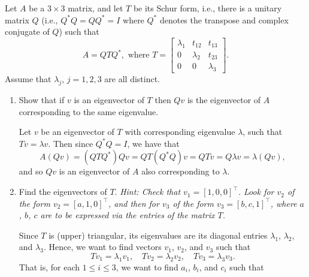 \documentclass{../../../kin_math}
\begin{document}
\begin{questions}
  \question Let $A$ be a $3 \times 3$ matrix, and let $T$ be its Schur form, i.e., there is a unitary matrix $Q$ (i.e., $Q^*Q = QQ^* = I$ where $Q^*$ denotes the transpose and complex conjugate of $Q$) such that
  \begin{equation*}
    A = QTQ^*, \text{ where } T = \begin{bmatrix} \lambda_1 & t_{12} & t_{13} \\ 0 & \lambda_2 & t_{23} \\ 0 & 0 & \lambda_3 \end{bmatrix}.
  \end{equation*}
  Assume that $\lambda_j$, $j = 1, 2, 3$ are all distinct.
  \begin{enumerate}
    \item Show that if $v$ is an eigenvector of $T$ then $Qv$ is the eigenvector of $A$ corresponding to the same eigenvalue.
    \begin{solution}
      Let $v$ be an eigenvector of $T$ with corresponding eigenvalue $\lambda$, such that $Tv = \lambda v$. Then since $Q^*Q = I$, we have that
      \begin{equation*}
        A(Qv) = (QTQ^*)Qv = QT(Q^*Q)v = QTv = Q\lambda v = \lambda (Qv),
      \end{equation*}
      and so $Qv$ is an eigenvector of $A$ also corresponding to $\lambda$.
    \end{solution}
    \item Find the eigenvectors of $T$. \emph{Hint: Check that $v_1 = [1, 0, 0]^\top$. Look for $v_2$ of the form $v_2 = [a, 1, 0]^\top$, and then for $v_3$ of the form $v_3 = [b, c, 1]^\top$, where $a$, $b$, $c$ are to be expressed via the entries of the matrix $T$.}
    \begin{solution}
      Since $T$ is (upper) triangular, its eigenvalues are its diagonal entries $\lambda_1$, $\lambda_2$, and $\lambda_3$. Hence, we want to find vectors $v_1$, $v_2$, and $v_3$ such that
      \begin{equation*}
        Tv_1 = \lambda_1v_1, \quad Tv_2 = \lambda_2v_2, \quad Tv_3 = \lambda_3v_3.
      \end{equation*}
      That is, for each $1 \leq i \leq 3$, we want to find $a_i$, $b_i$, and $c_i$ such that
      \begin{multline*}

\end{multline*}
\end{solution}
\end{enumerate}
\end{questions}
\end{document}
